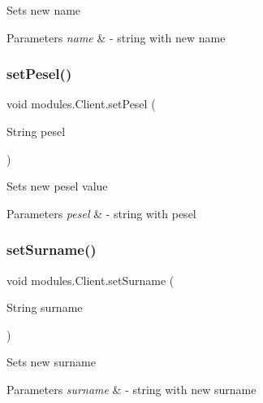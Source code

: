 Sets new name 
\begin{DoxyParams}{Parameters}
{\em name} & -\/ string with new name \\
\hline
\end{DoxyParams}
\mbox{\label{classmodules_1_1_client_acaea2a8b2086e298e3b22b86c409ecf4}} 
\subsubsection{\texorpdfstring{set\+Pesel()}{setPesel()}}
{\footnotesize\ttfamily void modules.\+Client.\+set\+Pesel (\begin{DoxyParamCaption}\item[{String}]{pesel }\end{DoxyParamCaption})\hspace{0.3cm}{\ttfamily [inline]}}

Sets new pesel value 
\begin{DoxyParams}{Parameters}
{\em pesel} & -\/ string with pesel \\
\hline
\end{DoxyParams}
\mbox{\label{classmodules_1_1_client_a06f2d345b05093b2d61ca6cfc1f406a1}} 
\subsubsection{\texorpdfstring{set\+Surname()}{setSurname()}}
{\footnotesize\ttfamily void modules.\+Client.\+set\+Surname (\begin{DoxyParamCaption}\item[{String}]{surname }\end{DoxyParamCaption})\hspace{0.3cm}{\ttfamily [inline]}}

Sets new surname 
\begin{DoxyParams}{Parameters}
{\em surname} & -\/ string with new surname \\
\hline
\end{DoxyParams}
\mbox{\label{classmodules_1_1_client_a9ed6710e3598afe3dda7dac426c495fe}} 
